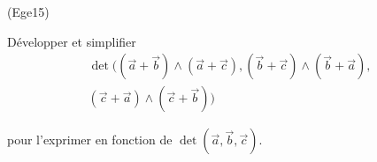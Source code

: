 \begin{tiny}(Ege15)\end{tiny} Développer et simplifier
\begin{multline*}
 \det(
(\overrightarrow  a + \overrightarrow b )\wedge (\overrightarrow  a + \overrightarrow c),
(\overrightarrow  b + \overrightarrow c )\wedge (\overrightarrow  b + \overrightarrow a),\\
(\overrightarrow  c + \overrightarrow a )\wedge (\overrightarrow  c + \overrightarrow b)
)
\end{multline*}

pour l'exprimer en fonction de $\det(\overrightarrow a,\overrightarrow b,\overrightarrow c)$.
